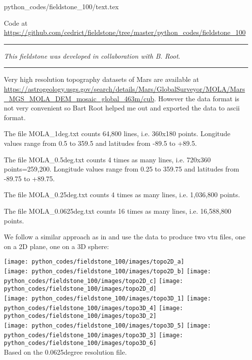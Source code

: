 \begin{flushright} {\tiny {\color{gray} python\_codes/fieldstone\_100/text.tex}} \end{flushright}

%

\begin{center}
Code at \url{https://github.com/cedrict/fieldstone/tree/master/python_codes/fieldstone_100}
\end{center}

\par\noindent\rule{\textwidth}{0.4pt}

{\sl This fieldstone was developed in collaboration with B. Root}. 

\par\noindent\rule{\textwidth}{0.4pt}

Very high resolution topography datasets of Mars are available at 
\url{https://astrogeology.usgs.gov/search/details/Mars/GlobalSurveyor/MOLA/Mars_MGS_MOLA_DEM_mosaic_global_463m/cub}.
However the data format is not very convenient so Bart Root 
helped me out and exported the data to ascii format.

The file {\filenamefont MOLA\_1deg.txt} counts 64,800 lines, 
i.e. 360x180 points. Longitude values range from  
0.5 to 359.5 and latitudes from -89.5 to +89.5. 

The file {\filenamefont MOLA\_0.5deg.txt} counts 4 times as many lines, 
i.e. 720x360 points=259,200. Longitude values range from  
0.25 to 359.75 and latitudes from -89.75 to +89.75. 

The file {\filenamefont MOLA\_0.25deg.txt} counts 4 times as many lines, 
i.e. 1,036,800 points.

The file {\filenamefont MOLA\_0.0625deg.txt} counts 16 times as many lines, 
i.e. 16,588,800 points.

We follow a similar approach as in  and use the data to produce 
two vtu files, one on a 2D plane, one on a 3D sphere:

\begin{center}
\texttt{[image: python\_codes/fieldstone\_100/images/topo2D\_a]}\\
\texttt{[image: python\_codes/fieldstone\_100/images/topo2D\_b]}
\texttt{[image: python\_codes/fieldstone\_100/images/topo2D\_c]}
\texttt{[image: python\_codes/fieldstone\_100/images/topo2D\_d]}\\
\texttt{[image: python\_codes/fieldstone\_100/images/topo3D\_1]}
\texttt{[image: python\_codes/fieldstone\_100/images/topo3D\_4]}
\texttt{[image: python\_codes/fieldstone\_100/images/topo3D\_2]}\\
\texttt{[image: python\_codes/fieldstone\_100/images/topo3D\_5]}
\texttt{[image: python\_codes/fieldstone\_100/images/topo3D\_3]}
\texttt{[image: python\_codes/fieldstone\_100/images/topo3D\_6]}\\
{\captionfont Based on the 0.0625degree resolution file.}
\end{center}

